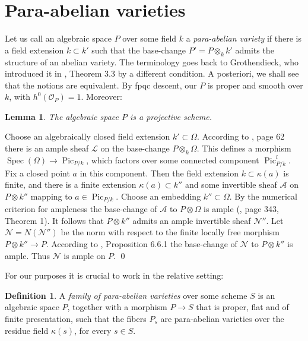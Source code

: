 \documentclass[oneside, 12pt]{amsart}
\newcommand\mylabel[1]{\label{#1}\marginpar{\raggedright\vspace{-1ex}\medskip\medskip\footnotesize \tt #1}}
\renewcommand\mylabel[1]{\label{#1}}
\newtheorem{lemma}[theorem]{Lemma}
\theoremstyle{definition}
\newtheorem{definition}[theorem]{Definition}
\theoremstyle{remark}
\newcommand{\shA}{\mathscr{A}}
\newcommand{\shN}{\mathscr{N}}
\newcommand{\shL}{\mathscr{L}}
\renewcommand{\O}{\mathscr{O}}
\newcommand{\Pic}{\operatorname{Pic}}
\newcommand{\ra}{\rightarrow}
\newcommand{\Spec}{\operatorname{Spec}}
\begin{document}
\section{Para-abelian varieties}
\mylabel{Para-abelian varieties}

Let us call an  algebraic space $P$ over some field $k$ a \emph{para-abelian variety} if there
is a field extension $k\subset k'$ such that the base-change $P'=P\otimes_kk'$ admits
the structure of an abelian variety.   
The terminology goes back to Grothendieck, who  introduced  
it in \cite{FGA VI},  Theorem 3.3  by a different condition. A posteriori, we shall see  that
the notions are equivalent. 
By fpqc descent,  our $P$ is proper and smooth over $k$, with $h^0(\O_P)=1$. 
Moreover:

\begin{lemma}
\mylabel{projective}
The algebraic space $P$ is a projective scheme.
\end{lemma}

\proof
Choose an algebraically closed field extension $k'\subset\Omega$.
According to \cite{Mumford 1970}, page 62 there is an ample sheaf  $\shL$  on the base-change $P\otimes_k\Omega$. 
This defines a morphism $\Spec(\Omega)\ra\Pic_{P/k}$,
which factors over some connected component   $\Pic_{P/k}^{l}$.
Fix a closed point $a$ in this component. Then the field extension $k\subset\kappa(a)$ is finite,
and there is a finite extension $\kappa(a)\subset k''$ and some invertible sheaf $\shA$ on $P\otimes k''$
mapping to $a\in \Pic_{P/k}$. Choose an embedding $k''\subset \Omega$. 
By the numerical criterion for ampleness the base-change  of $\shA$ to $P\otimes\Omega$ is  ample  (\cite{Kleiman 1966}, page 343, Theorem 1).
It follows that   $P\otimes k''$ admits an ample invertible sheaf $\shN''$. Let $\shN=N (\shN'')$ be the norm
with respect to the finite locally free morphism $P\otimes k''\ra P$.
According to \cite{EGA II}, Proposition 6.6.1 the base-change  of $\shN$ to $P\otimes k''$ is ample.
Thus $\shN$ is ample on $P$.
\qed

\medskip
For our purposes it is crucial to work in the relative setting: 

\begin{definition}
\mylabel{def family para-abelian}
A \emph{family of para-abelian varieties} over some scheme $S$
is an algebraic space $P$, together with a morphism $P\ra S$ that is proper, flat and of finite presentation, such that the fibers $P_s$ are para-abelian varieties
over the residue field $\kappa(s)$, for every $s\in S$.
\end{definition}
\end{document}
